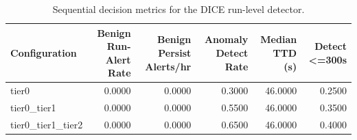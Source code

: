 \begin{table}[t]
\centering
\caption{Sequential decision metrics for the DICE run-level detector.}
\label{tab:dice_sequential_metrics}
\footnotesize
\begin{tabular}{lrrrrr}
\toprule
Configuration & Benign Run-Alert Rate & Benign Persist Alerts/hr & Anomaly Detect Rate & Median TTD (s) & Detect <=300s \\
\midrule
tier0 & 0.0000 & 0.0000 & 0.3000 & 46.0000 & 0.2500 \\
tier0_tier1 & 0.0000 & 0.0000 & 0.5500 & 46.0000 & 0.3500 \\
tier0_tier1_tier2 & 0.0000 & 0.0000 & 0.6500 & 46.0000 & 0.4000 \\
\bottomrule
\end{tabular}

\end{table}

